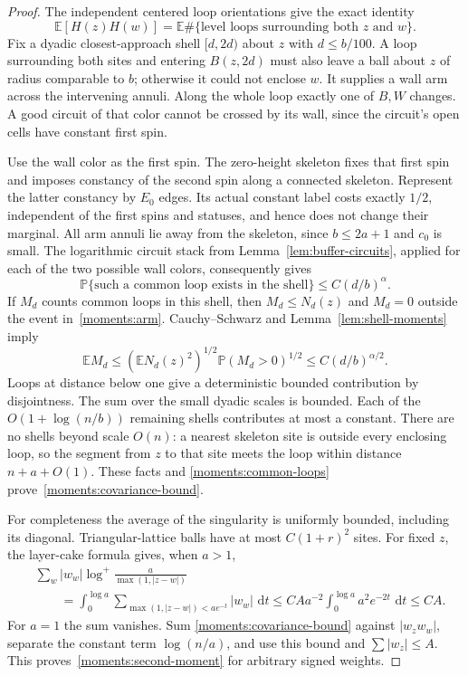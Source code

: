 \documentclass[11pt]{article}
\newcommand{\E}{\mathbb E}
\newcommand{\Prob}{\mathbb P}
\newcommand{\dd}{\,\mathrm d}
\theoremstyle{definition}
\theoremstyle{remark}
\numberwithin{equation}{section}
\begin{document}
\begin{proof}
The independent centered loop orientations give the exact identity
\begin{equation}\label{moments:common-loops}
 \E[H(z)H(w)]
 =\E\#\{\text{level loops surrounding both $z$ and $w$}\}.
\end{equation}
Fix a dyadic closest-approach shell $[d,2d)$ about $z$ with
$d\leq b/100$.  A loop surrounding both sites and entering $B(z,2d)$
must also leave a ball about $z$ of radius comparable to $b$; otherwise
it could not enclose $w$.  It supplies a wall arm across the intervening
annuli.  Along the whole loop exactly one of $B,W$ changes.  A good
circuit of that color cannot be crossed by its wall, since the circuit's
open cells have constant first spin.

Use the wall color as the first spin.  The zero-height skeleton fixes
that first spin and imposes constancy of the second spin along a
connected skeleton.  Represent the latter constancy by $E_0$ edges.
Its actual constant label costs exactly $1/2$, independent of the
first spins and statuses, and hence does not change their marginal.
All arm annuli lie away from the skeleton, since $b\leq2a+1$ and
$c_0$ is small.  The logarithmic circuit stack from
Lemma~\ref{lem:buffer-circuits}, applied for each of the two possible
wall colors, consequently gives
\begin{equation}\label{moments:arm}
 \Prob\{\text{such a common loop exists in the shell}\}
 \leq C(d/b)^\alpha.
\end{equation}
If $M_d$ counts common loops in this shell, then
$M_d\leq N_d(z)$ and $M_d=0$ outside the event in~\eqref{moments:arm}.
Cauchy--Schwarz and Lemma~\ref{lem:shell-moments} imply
\[
 \E M_d\leq (\E N_d(z)^2)^{1/2}
       \Prob(M_d>0)^{1/2}
 \leq C(d/b)^{\alpha/2}.
\]
Loops at distance below one give a deterministic bounded contribution
by disjointness.  The sum over the small dyadic scales is bounded.
Each of the
$O(1+\log(n/b))$ remaining shells contributes at most a constant.
There are no shells beyond scale $O(n)$: a nearest skeleton site is
outside every enclosing loop, so the segment from $z$ to that site
meets the loop within distance $n+a+O(1)$.  These facts and
\eqref{moments:common-loops} prove~\eqref{moments:covariance-bound}.

For completeness the average of the singularity is uniformly bounded,
including its diagonal.  Triangular-lattice balls have at most
$C(1+r)^2$ sites.  For fixed $z$, the layer-cake formula gives, when
$a>1$,
\begin{align*}
 &\sum_w |w_w|\log^+\frac{a}{\max(1,|z-w|)}\\
 &\qquad=\int_0^{\log a}
      \sum_{\max(1,|z-w|)<ae^{-t}}|w_w|\,\dd t
 \leq C A a^{-2}\int_0^{\log a}a^2e^{-2t}\,\dd t
 \leq C A.
\end{align*}
For $a=1$ the sum vanishes.  Sum
\eqref{moments:covariance-bound} against $|w_zw_w|$, separate the
constant term $\log(n/a)$, and use this bound and
$\sum|w_z|\leq A$.  This proves~\eqref{moments:second-moment}
for arbitrary signed weights.
\end{proof}
\end{document}
